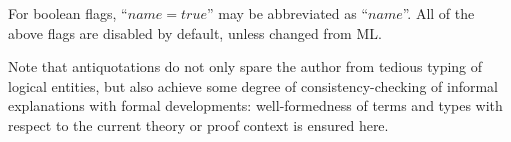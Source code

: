 For boolean flags, ``$name = true$'' may be abbreviated as ``$name$''.  All of
the above flags are disabled by default, unless changed from ML.

\medskip Note that antiquotations do not only spare the author from tedious
typing of logical entities, but also achieve some degree of
consistency-checking of informal explanations with formal developments:
well-formedness of terms and types with respect to the current theory or proof
context is ensured here.

